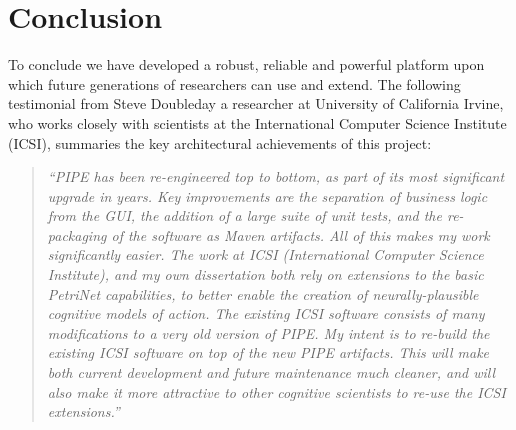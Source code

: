 \section{Conclusion}
To conclude we have developed a robust, reliable and powerful platform upon which future generations of researchers can use and extend. The following testimonial from Steve Doubleday a researcher at University of California Irvine, who works closely with scientists at the International Computer Science Institute (ICSI), summaries the key architectural achievements of this project:

\begin{quote}
\singlespacing
    \textit{``PIPE has been re-engineered top to bottom, as part of its most significant upgrade in years. Key improvements are the separation of business logic from the GUI, the addition of a large suite of unit tests, and the re-packaging of the software as Maven artifacts.  All of this makes my work significantly easier. The work at ICSI (International Computer Science Institute), and my own dissertation both rely on extensions to the basic PetriNet capabilities, to better enable the creation of neurally-plausible cognitive models of action. The existing ICSI software consists of many modifications to a very old version of PIPE. My intent is to re-build the existing ICSI software on top of the new PIPE artifacts. This will make both current development and future maintenance much cleaner, and will also make it more attractive to other cognitive scientists to re-use the ICSI extensions.''}
\end{quote}